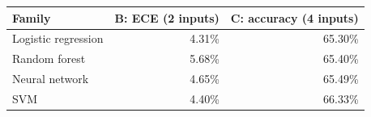 \begin{tabularx}{\linewidth}{@{}Yrr@{}}
\toprule
Family & B: ECE (2 inputs) & C: accuracy (4 inputs) \\

\midrule
Logistic regression & 4.31\% & 65.30\% \\
Random forest & 5.68\% & 65.40\% \\
Neural network & 4.65\% & 65.49\% \\
SVM & 4.40\% & 66.33\% \\
\bottomrule
\end{tabularx}
